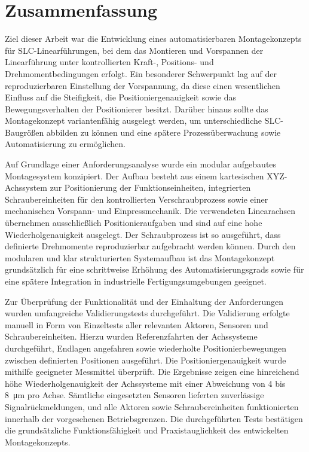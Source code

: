 \section{Zusammenfassung}
Ziel dieser Arbeit war die Entwicklung eines automatisierbaren Montagekonzepts für SLC-Linearführungen, bei dem das Montieren und Vorspannen der Linearführung unter kontrollierten Kraft-, Positions- und Drehmomentbedingungen erfolgt. Ein besonderer Schwerpunkt lag auf der reproduzierbaren Einstellung der Vorspannung, da diese einen wesentlichen Einfluss auf die Steifigkeit, die Positioniergenauigkeit sowie das Bewegungsverhalten der Positionierer besitzt. Darüber hinaus sollte das Montagekonzept variantenfähig ausgelegt werden, um unterschiedliche SLC-Baugrößen abbilden zu können und eine spätere Prozessüberwachung sowie Automatisierung zu ermöglichen.

Auf Grundlage einer Anforderungsanalyse wurde ein modular aufgebautes Montagesystem konzipiert. Der Aufbau besteht aus einem kartesischen XYZ-Achssystem zur Positionierung der Funktionseinheiten, integrierten Schraubereinheiten für den kontrollierten Verschraubprozess sowie einer mechanischen Vorspann- und Einpressmechanik. Die verwendeten Linearachsen übernehmen ausschließlich Positionieraufgaben und sind auf eine hohe Wiederholgenauigkeit ausgelegt. Der Schraubprozess ist so ausgeführt, dass definierte Drehmomente reproduzierbar aufgebracht werden können. Durch den modularen und klar strukturierten Systemaufbau ist das Montagekonzept grundsätzlich für eine schrittweise Erhöhung des Automatisierungsgrads sowie für eine spätere Integration in industrielle Fertigungsumgebungen geeignet.

Zur Überprüfung der Funktionalität und der Einhaltung der Anforderungen wurden umfangreiche Validierungstests durchgeführt. Die Validierung erfolgte manuell in Form von Einzeltests aller relevanten Aktoren, Sensoren und Schraubereinheiten. Hierzu wurden Referenzfahrten der Achssysteme durchgeführt, Endlagen angefahren sowie wiederholte Positionierbewegungen zwischen definierten Positionen ausgeführt. Die Positioniergenauigkeit wurde mithilfe geeigneter Messmittel überprüft. Die Ergebnisse zeigen eine hinreichend höhe Wiederholgenauigkeit der Achssysteme mit einer Abweichung von 4 bis \qty{8}{\micro\meter} pro Achse. Sämtliche eingesetzten Sensoren lieferten zuverlässige Signalrückmeldungen, und alle Aktoren sowie Schraubereinheiten funktionierten innerhalb der vorgesehenen Betriebsgrenzen. Die durchgeführten Tests bestätigen die grundsätzliche Funktionsfähigkeit und Praxistauglichkeit des entwickelten Montagekonzepts.

